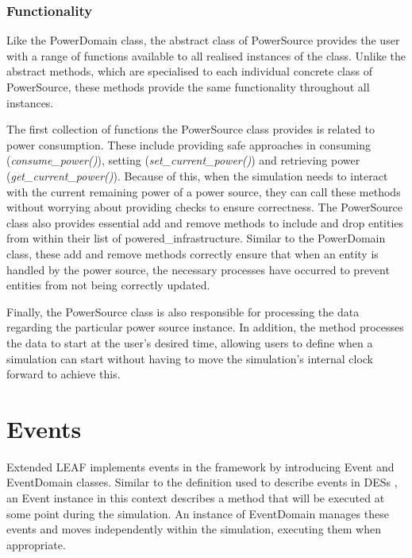 \documentclass{l4proj}
\begin{document}
\subsubsection{Functionality}\label{imp:subsec:utility-funcs}
Like the PowerDomain class, the abstract class of PowerSource provides the user with a range of functions available to all realised instances of the class.
Unlike the abstract methods, which are specialised to each individual concrete class of PowerSource, these methods provide the same functionality throughout all instances.

The first collection of functions the PowerSource class provides is related to power consumption.
These include providing safe approaches in consuming (\textit{consume\_power()}), setting (\textit{set\_current\_power()}) and retrieving power (\textit{get\_current\_power()}).
Because of this, when the simulation needs to interact with the current remaining power of a power source, they can call these methods without worrying about providing checks to ensure correctness.
The PowerSource class also provides essential add and remove methods to include and drop entities from within their list of powered\_infrastructure.
Similar to the PowerDomain class, these add and remove methods correctly ensure that when an entity is handled by the power source, the necessary processes have occurred to prevent entities from not being correctly updated.

Finally, the PowerSource class is also responsible for processing the data regarding the particular power source instance.
In addition, the method processes the data to start at the user's desired time, allowing users to define when a simulation can start without having to move the simulation's internal clock forward to achieve this.

\section{Events}\label{imp:sec:envts}
Extended LEAF implements events in the framework by introducing Event and EventDomain classes.
Similar to the definition used to describe events in DESs \citep{Des}, an Event instance in this context describes a method that will be executed at some point during the simulation.
An instance of EventDomain manages these events and moves independently within the simulation, executing them when appropriate.
\end{document}

